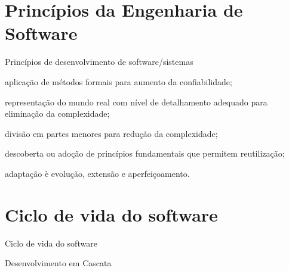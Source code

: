 
\lecturetitle{\course}{\insertlecture}

\frame{\maketitle}

\section{Princípios da Engenharia de Software}

\begin{frame}{Princípios de desenvolvimento de software/sistemas}

  \begin{description}[<+-| alert@+>]
  \item[Formalização:] aplicação de métodos formais para aumento da
    confiabilidade;
  \item[Abstração:] representação do mundo real com nível de
    detalhamento adequado para eliminação da complexidade;
  \item[Decomposição:] divisão em partes menores para redução 
    da complexidade;
  \item[Generalização:] descoberta ou adoção de princípios
    fundamentais que permitem reutilização;
  \item[Flexibilização:] adaptação è evolução, extensão e
    aperfeiçoamento.
  \end{description}
  
\end{frame}

\section{Ciclo de vida do software}
  
\begin{frame}{Ciclo de vida do software}



\end{frame}


\begin{frame}{Desenvolvimento em Cascata}

  

\end{frame}

